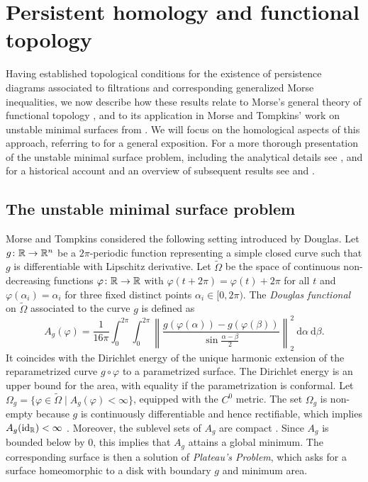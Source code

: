 
\section{Persistent homology and functional topology} \label{s:surfaces}

Having established topological conditions for the existence of persistence diagrams associated to filtrations and corresponding generalized Morse inequalities, we now describe how these results relate to Morse's general theory of functional topology \cite{Morse.1937, Morse.1938, Morse.1940}, and to its application in Morse and Tompkins' work on unstable minimal surfaces from \cite{Morse.1939}.
We will focus on the homological aspects of this approach, referring to \cite[Sections 4.3--5]{Bott.1980} for a general exposition.
For a more thorough presentation of the unstable minimal surface problem, including the analytical details see \cite[Section II.6]{Struwe.1988}, and for a historical account and an overview of subsequent results see \cite[Section 6]{Dierkes.2010} and \cite[Section 6.8.1]{Dierkes.2010b}.

\subsection{The unstable minimal surface problem}
\label{subsec:unstable}

Morse and Tompkins considered the following setting introduced by Douglas.
Let $g \colon \mathbb{R} \to \mathbb{R}^n$ be a $2\pi$-periodic function representing a simple closed curve such that $g$ is differentiable with Lipschitz derivative.
Let $\widetilde{\Omega}$ be the space of continuous non-decreasing functions $\varphi \colon \mathbb{R} \to \mathbb{R}$ with $\varphi(t+2\pi) = \varphi(t) + 2\pi$ for all $t$ and $\varphi(\alpha_i)=\alpha_i$ for three fixed distinct points $\alpha_i \in [0,2\pi)$.
The \emph{Douglas functional} on $\widetilde \Omega$ associated to the curve $g$ is defined \cite{Douglas.1931} as
\begin{equation*}
A_g(\varphi) = \frac{1}{16 \pi} \int_0^{2\pi} \int_0^{2\pi} \left\| \frac{g(\varphi(\alpha)) - g(\varphi(\beta))}{\sin \frac{\alpha-\beta}{2}} \right\|_2^2 \ \mathrm{d}\alpha \ \mathrm{d}\beta.
\end{equation*}
It coincides with the Dirichlet energy of the unique harmonic extension of the reparametrized curve $g \circ \varphi$ to a parametrized surface.
The Dirichlet energy is an upper bound for the area, with equality if the parametrization is conformal.
Let $\Omega_g = \{\varphi \in \widetilde\Omega \mid A_g(\varphi) < \infty\}$, equipped with the $C^0$ metric.
The set $\Omega_g$ is non-empty because $g$ is continuously differentiable and hence rectifiable, which implies $A_g(\operatorname{id}_{\mathbb{R}}) < \infty$ \cite[p.~267-268]{Douglas.1931}.
Moreover, the sublevel sets of $A_g$ are compact \cite[p.~448]{Morse.1939}.
Since $A_g$ is bounded below by $0$, this implies that $A_g$ attains a global minimum.
The corresponding surface is then a solution of \emph{Plateau's Problem}, which asks for a surface homeomorphic to a disk with boundary $g$ and minimum area.

